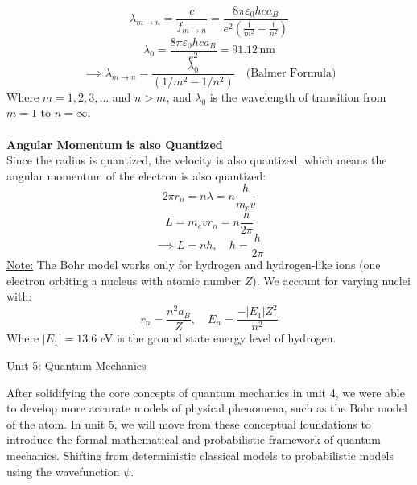 \documentclass[12pt]{article}
\begin{document}
\[\lambda_{m\to n} = \frac{c}{f_{m\to n}} = \frac{8\pi\varepsilon_0 h c a_B}{e^2 \left(\frac{1}{m^2}-\frac{1}{n^2}\right)}\]
\[\lambda_0 = \frac{8\pi\varepsilon_0 h c a_B}{e^2} = 91.12\, \text{nm}\]
\[\implies \boxed{\lambda_{m\to n} = \frac{\lambda_0}{(1/m^2 - 1/n^2)}\quad\text{(Balmer Formula)}}\]
Where $m=1, 2, 3, \ldots$ and $n>m$, and $\lambda_0$ is the wavelength of transition from $m=1$ to $n=\infty$.\\\\
\textbf{Angular Momentum is also Quantized}\\
Since the radius is quantized, the velocity is also quantized, which means the angular momentum of the electron is also quantized:
\[2\pi r_n = n\lambda = n\frac{h}{m_e v}\]
\[L = m_e v r_n = n\frac{h}{2\pi}\]
\[\implies \boxed{L = n\hbar, \quad \hbar = \frac{h}{2\pi}}\]
\underline{Note:} The Bohr model works only for hydrogen and hydrogen-like ions (one electron orbiting a nucleus with atomic number $Z$). We account for varying nuclei with:
\[r_n = \frac{n^2 a_B}{Z}, \quad E_n = \frac{-|E_1|Z^2}{n^2}\]
Where $|E_1|=13.6$ eV is the ground state energy level of hydrogen.
\newpage
{\centering\LARGE Unit 5: Quantum Mechanics\par}\noindent
After solidifying the core concepts of quantum mechanics in unit 4, we were able to develop more accurate models of physical phenomena, such as the Bohr model of the atom. In unit 5, we will move from these conceptual foundations to introduce the formal mathematical and probabilistic framework of quantum mechanics. Shifting from deterministic classical models to probabilistic models using the wavefunction $\psi$.
\end{document}
